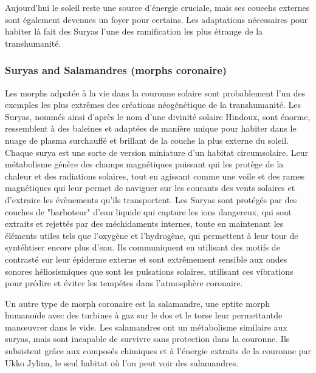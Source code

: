                                                 Aujourd'hui le soleil reste une source d'énergie cruciale, mais ses coucehs externes sont également devenues un foyer pour certains. Les adaptations nécessaires pour habiter là fait des Suryas l'une des ramification les plus étrange de la transhumanité. 

                                                \subsubsection{Suryas and Salamandres (morphs coronaire)} \label{sec:sury-salam-coron} 

                                                Les morphs adpatée à la vie dans la couronne solaire sont probablement l'un des exemples les plus extrêmes des créations néogénétique de la transhumanité. Les Suryas, nommés ainsi d'après le nom d'une divinité solaire Hindoux, sont énorme, ressemblent à des baleines et adaptées de manière unique pour habiter dans le nuage de plasma surchauffé et brillant de la couche la plus externe du soleil. Chaque surya est une sorte de version miniature d'un habitat circumsolaire. Leur métabolisme génère des champs magnétiques puissant qui les protège de la chaleur et des radiations solaires, tout en agissant comme une voile et des rames magnétiques qui leur permet de naviguer sur les courants des vents solaires et d'extraire les évènements qu'ils transportent. Les Suryas sont protégés par des couches de "barboteur" d'eau liquide qui capture les ions dangereux, qui sont extraits et rejettés par des méchidaments internes, toute en maintenant les éléments utiles tels que l'oxygène et l'hydrogène, qui permettent à leur tour de syntéhtiser encore plus d'eau. Ils communiquent en utilisant des motifs de contrasté sur leur épiderme externe et sont extrêmement sensible aux ondes sonores héliosismiques que sont les pulsations solaires, utilisant ces vibrations pour prédire et éviter les tempêtes dans l'atmosphère coronaire. 

                                                Un autre type de morph coronaire est la salamandre, une eptite morph humanoïde avec des turbines à gaz sur le dos et le torse leur permettantde manœuvrer dans le vide. Les salamandres ont un métabolisme similaire aux suryas, mais sont incapable de survivre sans protection dans la couronne. Ils subsistent grâce aux composés chimiques et à l'énergie extraits de la couronne par Ukko Jylina, le seul habitat où l'on peut voir des salamandres. 

